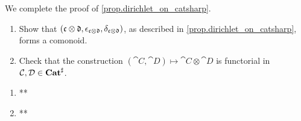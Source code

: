 \documentclass[Book-Poly]{subfiles}
\begin{document}
\begin{exercise}\label{exc.dirichlet_on_catsharp}
We complete the proof of \cref{prop.dirichlet_on_catsharp}.
\begin{enumerate}
	\item Show that $(\mathfrak{c}\otimes\mathfrak{d},\epsilon_{\mathfrak{c}\otimes\mathfrak{d}},\delta_{\mathfrak{c}\otimes\mathfrak{d}})$, as described in \cref{prop.dirichlet_on_catsharp}, forms a comonoid.
	\item Check that the construction $(\cat{C},\cat{D})\mapsto\cat{C}\otimes\cat{D}$ is functorial in $\mathcal{C},\mathcal{D}\in\mathbf{Cat}^\sharp$.
\qedhere
\end{enumerate}
\begin{solution}
\begin{enumerate}
    \item **
    \item **
\end{enumerate}
\end{solution}
\end{exercise}
%
%
%
%
%
\end{document}
